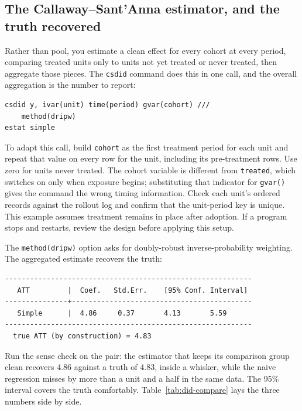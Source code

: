 \documentclass[
    a4paper,
    fontsize=10pt,
    twoside=true,
    numbers=noenddot,
]{kaobook}
\begin{document}
\subsection{The Callaway--Sant'Anna estimator, and the truth recovered}
Rather than pool, you estimate a clean effect for every cohort at every period, comparing treated units only to units not yet treated or never treated, then aggregate those pieces. The \texttt{csdid} command does this in one call, and the overall aggregation is the number to report:
\par
{\footnotesize
\begin{verbatim}
csdid y, ivar(unit) time(period) gvar(cohort) ///
    method(dripw)
estat simple
\end{verbatim}
}
To adapt this call, build \texttt{cohort} as the first treatment period for each unit and repeat that value on every row for the unit, including its pre-treatment rows. Use zero for units never treated. The cohort variable is different from \texttt{treated}, which switches on only when exposure begins; substituting that indicator for \texttt{gvar()} gives the command the wrong timing information. Check each unit's ordered records against the rollout log and confirm that the unit-period key is unique. This example assumes treatment remains in place after adoption. If a program stops and restarts, review the design before applying this setup.

The \texttt{method(dripw)} option asks for doubly-robust inverse-probability weighting. The aggregated estimate recovers the truth:
\par
{\footnotesize
\begin{verbatim}
-----------------------------------------------------------
   ATT         |  Coef.   Std.Err.    [95% Conf. Interval]
---------------+-------------------------------------------
   Simple      |  4.86     0.37       4.13       5.59
-----------------------------------------------------------
  true ATT (by construction) = 4.83
\end{verbatim}
}
Run the sense check on the pair: the estimator that keeps its comparison group clean recovers 4.86 against a truth of 4.83, inside a whisker, while the naive regression misses by more than a unit and a half in the same data. The 95\% interval covers the truth comfortably. Table~\ref{tab:did-compare} lays the three numbers side by side.
\end{document}
